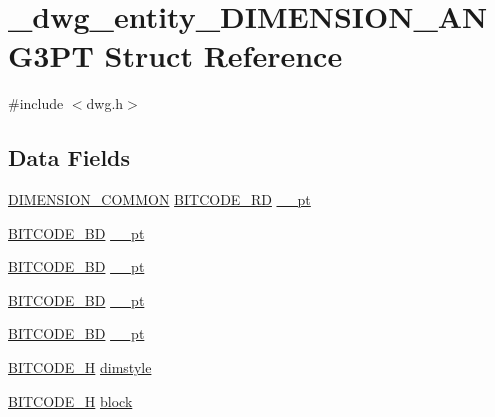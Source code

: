 \hypertarget{struct__dwg__entity__DIMENSION__ANG3PT}{\section{\-\_\-dwg\-\_\-entity\-\_\-\-D\-I\-M\-E\-N\-S\-I\-O\-N\-\_\-\-A\-N\-G3\-P\-T \-Struct \-Reference}
\label{struct__dwg__entity__DIMENSION__ANG3PT}
}


{\ttfamily \#include $<$dwg.\-h$>$}

\subsection*{\-Data \-Fields}
\begin{DoxyCompactItemize}
\item 
\hyperlink{dwg_8h_a334d626d7e4a0a1af39036446dfa82c4}{\-D\-I\-M\-E\-N\-S\-I\-O\-N\-\_\-\-C\-O\-M\-M\-O\-N} \hyperlink{dwg_8h_a1d23a9bc9a02453876b244dc6706f6a6}{\-B\-I\-T\-C\-O\-D\-E\-\_\-R\-D} \hyperlink{struct__dwg__entity__DIMENSION__ANG3PT_a42989a0026ed337d06bb155ee9a9d039}{\-\_\-\_\-pt}
\item 
\hyperlink{dwg_8h_a00698ef1bb072aa0a9360c6fc1c57587}{\-B\-I\-T\-C\-O\-D\-E\-\_\-B\-D} \hyperlink{struct__dwg__entity__DIMENSION__ANG3PT_a9cac9a0d005768b8027933abda1df418}{\-\_\-\_\-pt}
\item 
\hyperlink{dwg_8h_a00698ef1bb072aa0a9360c6fc1c57587}{\-B\-I\-T\-C\-O\-D\-E\-\_\-B\-D} \hyperlink{struct__dwg__entity__DIMENSION__ANG3PT_a66822e9ae51486f03137d0b0bb294ea5}{\-\_\-\_\-pt}
\item 
\hyperlink{dwg_8h_a00698ef1bb072aa0a9360c6fc1c57587}{\-B\-I\-T\-C\-O\-D\-E\-\_\-B\-D} \hyperlink{struct__dwg__entity__DIMENSION__ANG3PT_ab2796b541bf1f46acbcfd6a11c5e11dc}{\-\_\-\_\-pt}
\item 
\hyperlink{dwg_8h_a00698ef1bb072aa0a9360c6fc1c57587}{\-B\-I\-T\-C\-O\-D\-E\-\_\-B\-D} \hyperlink{struct__dwg__entity__DIMENSION__ANG3PT_af30728b54fa674fc977877ec79150ed1}{\-\_\-\_\-pt}
\item 
\hyperlink{dwg_8h_a7c700e94e047a97ba8c24bdfe4029dc3}{\-B\-I\-T\-C\-O\-D\-E\-\_\-\-H} \hyperlink{struct__dwg__entity__DIMENSION__ANG3PT_a5a4068fe0e555d6f8df4baf60ceab774}{dimstyle}
\item 
\hyperlink{dwg_8h_a7c700e94e047a97ba8c24bdfe4029dc3}{\-B\-I\-T\-C\-O\-D\-E\-\_\-\-H} \hyperlink{struct__dwg__entity__DIMENSION__ANG3PT_a71dc93c02da51c751a28dbbac7ff5094}{block}
\end{DoxyCompactItemize}


